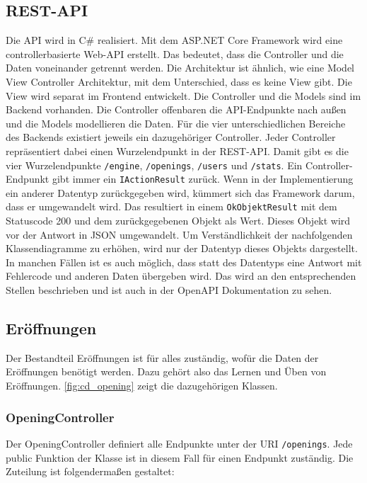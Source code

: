 \subsection{REST-API}
Die API wird in C\# realisiert. Mit dem ASP.NET Core Framework wird eine controllerbasierte Web-API erstellt. Das bedeutet, dass die Controller und die Daten voneinander getrennt werden. Die Architektur ist ähnlich, wie eine Model View Controller Architektur, mit dem Unterschied, dass es keine View gibt. Die View wird separat im Frontend entwickelt. Die Controller und die Models sind im Backend vorhanden. Die Controller offenbaren die API-Endpunkte nach außen und die Models modellieren die Daten. Für die vier unterschiedlichen Bereiche des Backends existiert jeweils ein dazugehöriger Controller. Jeder Controller repräsentiert dabei einen Wurzelendpunkt in der REST-API. Damit gibt es die vier Wurzelendpunkte \lstinline{/engine}, \lstinline{/openings}, \lstinline{/users} und \lstinline{/stats}. Ein Controller-Endpunkt gibt immer ein \lstinline{IActionResult} zurück. Wenn in der Implementierung ein anderer Datentyp zurückgegeben wird, kümmert sich das Framework darum, dass er umgewandelt wird. Das resultiert in einem \lstinline{OkObjektResult} mit dem Statuscode 200 und dem zurückgegebenen Objekt als Wert. Dieses Objekt wird vor der Antwort in JSON umgewandelt. Um Verständlichkeit der nachfolgenden Klassendiagramme zu erhöhen, wird nur der Datentyp dieses Objekts dargestellt. In manchen Fällen ist es auch möglich, dass statt des Datentyps eine Antwort mit Fehlercode und anderen Daten übergeben wird. Das wird an den entsprechenden Stellen beschrieben und ist auch in der OpenAPI Dokumentation zu sehen.

\subsection{Eröffnungen}
\label{cp:openings}
Der Bestandteil Eröffnungen ist für alles zuständig, wofür die Daten der Eröffnungen benötigt werden. Dazu gehört also das Lernen und Üben von Eröffnungen. \autoref{fig:cd_opening} zeigt die dazugehörigen Klassen.

\subsubsection{OpeningController}
Der OpeningController definiert alle Endpunkte unter der URI \lstinline{/openings}.
Jede public Funktion der Klasse ist in diesem Fall für einen Endpunkt zuständig. Die Zuteilung ist folgendermaßen gestaltet:

